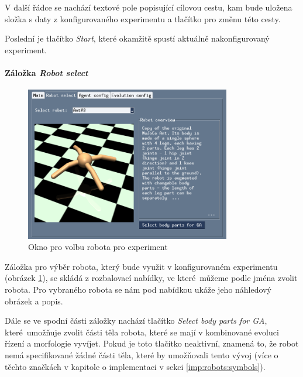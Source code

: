 V další řádce se nachází textové pole popisující cílovou cestu, kam bude
uložena složka s daty z konfigurovaného experimentu a tlačítko pro změnu této
cesty.

Poslední je tlačítko \emph{Start}, které okamžitě spustí aktuálně
nakonfigurovaný experiment.

\paragraph{Záložka \emph{Robot select}}
\begin{figure}[!htb]
    \centering
    \includegraphics[width=0.8\textwidth]{../img/GUI_robot_tab.jpg}
    \caption{Okno pro volbu robota pro experiment}
    \label{doc_12_fig:GUI_robot}
\end{figure}

Záložka pro výběr robota, který bude využit v konfigurovaném experimentu
(obrázek \ref{doc_12_fig:GUI_robot}), se skládá z rozbalovací nabídky, ve
které~můžeme podle jména zvolit robota. Pro vybraného robota se nám pod
nabídkou ukáže jeho náhledový obrázek a popis. 

Dále se ve spodní části záložky nachází tlačítko \emph{Select body parts for
GA}, které~umožňuje zvolit části těla robota, které se mají v kombinované
evoluci řízení a morfologie vyvíjet. Pokud je toto tlačítko neaktivní, znamená
to, že robot nemá specifikované žádné části těla, které by umožňovali tento
vývoj (více o těchto značkách v kapitole o implementaci v sekci
\ref{imp:robots:symbols}).

